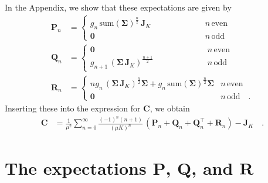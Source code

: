 \documentclass[modern]{aastex62}
\begin{document}
%
In the Appendix, we show that these expectations are given by
%
\begin{align}
    \mathbf{P}_n & =
    \begin{cases}
        g_n \, \mathrm{sum}(\pmb{\Sigma})^\frac{n}{2} \, \mathbf{J}_K
        \phantom{XXXXXXX} & n \, \mathrm{even}
        \\
        \mathbf{0}        & n \, \mathrm{odd}
    \end{cases}
    \\[1em]
    \mathbf{Q}_n & =
    \begin{cases}
        \mathbf{0}        & n \, \mathrm{even}
        \\
        g_{n+1} \, (\pmb{\Sigma} \, \mathbf{J}_K)^\frac{n + 1}{2}
        \phantom{XXXXXXX} & n \, \mathrm{odd}
    \end{cases}
    \\[1em]
    \mathbf{R}_n & =
    \begin{cases}
        n g_{n} \, (\pmb{\Sigma} \, \mathbf{J}_K)^\frac{n}{2}\pmb{\Sigma} + g_{n} \, \mathrm{sum}(\pmb{\Sigma})^\frac{n}{2} \pmb{\Sigma} & n \, \mathrm{even}
        \\
        \mathbf{0}                                                                                                                       & n \, \mathrm{odd}
        \quad.
    \end{cases}
\end{align}
%
Inserting these into the expression for $\mathbf{C}$, we obtain
%
\begin{align}
    \mathbf{C}
     & =
    \frac{1}{\mu^2}
    \sum\limits_{n=0}^\infty
    \frac{(-1)^n (n + 1)}{(\mu K)^n}
    \,
    \left(
    \mathbf{P}_n
    +
    \mathbf{Q}_n
    +
    \mathbf{Q}_n^\top
    +
    \mathbf{R}_n
    \right)
    - \mathbf{J}_K
    \quad.
\end{align}
%


\appendix

\section{The expectations $\mathbf{P}$, $\mathbf{Q}$, and $\mathbf{R}$}
\end{document}
